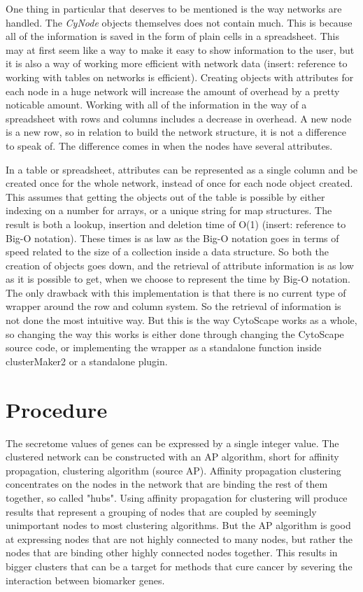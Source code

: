 \documentclass[UKenglish]{ifimaster}
\begin{document}
One thing in particular that deserves to be mentioned is the way networks are handled. The \textit{CyNode} objects
themselves does not contain much. This is because all of the information is saved in the form of plain cells in a
spreadsheet. This may at first seem like a way to make it easy to show information to the user, but it is also a way of
working more efficient with network data (insert: reference to working with tables on networks is efficient). Creating
objects with attributes for each node in a huge network will increase the amount of overhead by a pretty noticable
amount. Working with all of the information in the way of a spreadsheet with rows and columns includes a decrease in
overhead. A new node is a new row, so in relation to build the network structure, it is not a difference to speak of.
The difference comes in when the nodes have several attributes. 

In a table or spreadsheet, attributes can be represented as a single column and be created once for the whole network,
instead of once for each node object created. This assumes that getting the objects out of the table is possible by
either indexing on a number for arrays, or a unique string for map structures. The result is both a lookup, insertion
and deletion time of O(1) (insert: reference to Big-O notation).  These times is as law as the Big-O notation goes in
terms of speed related to the size of a collection inside a data structure. So both the creation of objects goes down,
and the retrieval of attribute information is as low as it is possible to get, when we choose to represent the time by
Big-O notation. The only drawback with this implementation is that there is no current type of wrapper around the row
and column system. So the retrieval of information is not done the most intuitive way. But this is the way CytoScape
works as a whole, so changing the way this works is either done through changing the CytoScape source code, or
implementing the wrapper as a standalone function inside clusterMaker2 or a standalone plugin.


\part{Procedure}
The secretome values of genes can be expressed by a single integer value. The clustered network can be constructed with
an AP algorithm, short for affinity propagation, clustering algorithm (source AP). Affinity propagation clustering
concentrates on the nodes in the network that are binding the rest of them together, so called "hubs". Using affinity
propagation for clustering will produce results that represent a grouping of nodes that are coupled by seemingly
unimportant nodes to most clustering algorithms. But the AP algorithm is good at expressing nodes that are not highly
connected to many nodes, but rather the nodes that are binding other highly connected nodes together. This results in
bigger clusters that can be a target for methods that cure cancer by severing the interaction between biomarker genes.
\end{document}
